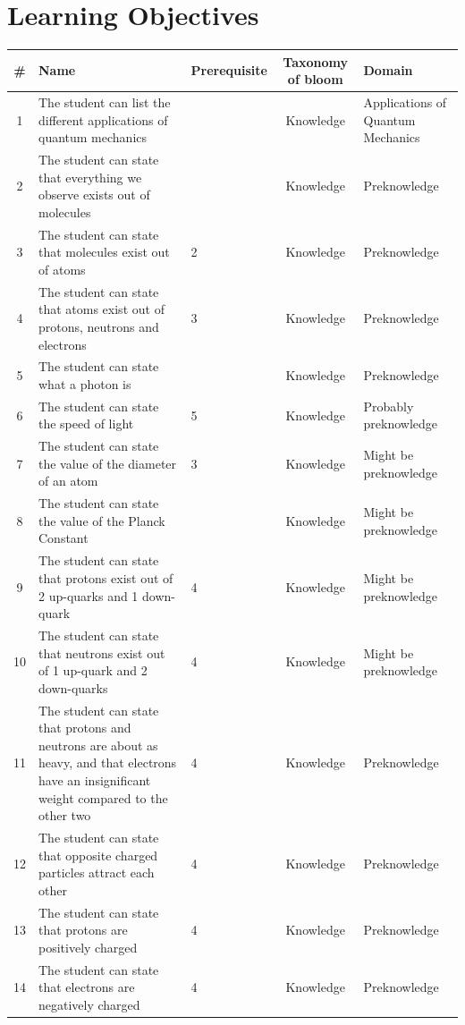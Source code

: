 \documentclass[11pt,twoside]{report} %
\begin{document}
\chapter{Learning Objectives}
\label{app:learningobjectives}

\begin{table}[htbp]
\small
\begin{center}
\begin{tabular}{|c|p{5cm}|p{1.5cm}|c|p{3cm}|}
\hline
\textbf{\#} & \textbf{Name} & \textbf{\footnotesize Prerequisite} & \textbf{Taxonomy of bloom} & \textbf{Domain} \\ \hline
1 & The student can list the different applications of quantum mechanics &  & Knowledge & Applications of Quantum Mechanics \\ \hline
2 & The student can state that everything we observe exists out of molecules &  & Knowledge & Preknowledge \\ \hline
3 & The student can state that molecules exist out of atoms & 2 & Knowledge & Preknowledge \\ \hline
4 & The student can state that atoms exist out of protons, neutrons and electrons & 3 & Knowledge & Preknowledge \\ \hline
5 & The student can state what a photon is &  & Knowledge & Preknowledge \\ \hline
6 & The student can state the speed of light & 5 & Knowledge & Probably preknowledge \\ \hline
7 & The student can state the value of the diameter of an atom & 3 & Knowledge & Might be preknowledge \\ \hline
8 & The student can state the value of the Planck Constant &  & Knowledge & Might be preknowledge \\ \hline
9 & The student can state that protons exist out of 2 up-quarks and 1 down-quark & 4 & Knowledge & Might be preknowledge \\ \hline
10 & The student can state that neutrons exist out of 1 up-quark and 2 down-quarks & 4 & Knowledge & Might be preknowledge \\ \hline
11 & The student can state that protons and neutrons are about as heavy, and that electrons have an insignificant weight compared to the other two & 4 & Knowledge & Preknowledge \\ \hline
12 & The student can state that opposite charged particles attract each other & 4 & Knowledge & Preknowledge \\ \hline
13 & The student can state that protons are positively charged & 4 & Knowledge & Preknowledge \\ \hline
14 & The student can state that electrons are negatively charged & 4 & Knowledge & Preknowledge \\ \hline
\end{tabular}
\end{center}
\label{completeoutline}
\end{table}
\end{document}
